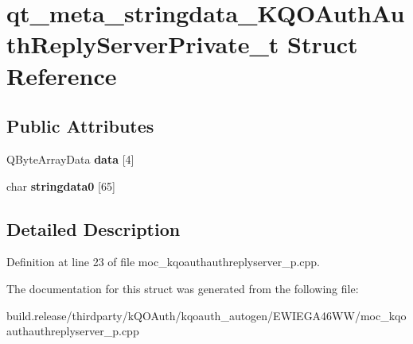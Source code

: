 \hypertarget{structqt__meta__stringdata___k_q_o_auth_auth_reply_server_private__t}{}\section{qt\+\_\+meta\+\_\+stringdata\+\_\+\+K\+Q\+O\+Auth\+Auth\+Reply\+Server\+Private\+\_\+t Struct Reference}
\label{structqt__meta__stringdata___k_q_o_auth_auth_reply_server_private__t}
\subsection*{Public Attributes}
\begin{DoxyCompactItemize}
\item 
\mbox{\label{structqt__meta__stringdata___k_q_o_auth_auth_reply_server_private__t_a42eb97c6aa6d8c7d8551a232867ceff7}} 
Q\+Byte\+Array\+Data {\bfseries data} \mbox{[}4\mbox{]}
\item 
\mbox{\label{structqt__meta__stringdata___k_q_o_auth_auth_reply_server_private__t_abd10372f18ae6b73c176ed3d343146f4}} 
char {\bfseries stringdata0} \mbox{[}65\mbox{]}
\end{DoxyCompactItemize}


\subsection{Detailed Description}


Definition at line 23 of file moc\+\_\+kqoauthauthreplyserver\+\_\+p.\+cpp.



The documentation for this struct was generated from the following file\+:\begin{DoxyCompactItemize}
\item 
build.\+release/thirdparty/k\+Q\+O\+Auth/kqoauth\+\_\+autogen/\+E\+W\+I\+E\+G\+A46\+W\+W/moc\+\_\+kqoauthauthreplyserver\+\_\+p.\+cpp\end{DoxyCompactItemize}

